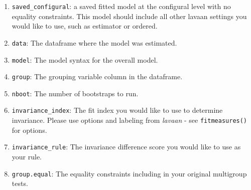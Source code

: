 \documentclass[
  man,floatsintext]{apa7}
\newenvironment{Shaded}{\begin{snugshade}}{\end{snugshade}}
\newcommand{\AttributeTok}[1]{\textcolor[rgb]{0.13,0.29,0.53}{#1}}
\newcommand{\CommentTok}[1]{\textcolor[rgb]{0.56,0.35,0.01}{\textit{#1}}}
\newcommand{\DecValTok}[1]{\textcolor[rgb]{0.00,0.00,0.81}{#1}}
\newcommand{\FunctionTok}[1]{\textcolor[rgb]{0.13,0.29,0.53}{\textbf{#1}}}
\newcommand{\NormalTok}[1]{#1}
\newcommand{\OtherTok}[1]{\textcolor[rgb]{0.56,0.35,0.01}{#1}}
\newcommand{\SpecialCharTok}[1]{\textcolor[rgb]{0.81,0.36,0.00}{\textbf{#1}}}
\newcommand{\StringTok}[1]{\textcolor[rgb]{0.31,0.60,0.02}{#1}}
\providecommand{\tightlist}{%
  \setlength{\itemsep}{0pt}\setlength{\parskip}{0pt}}
\begin{document}
\begin{enumerate}
\def\labelenumi{\arabic{enumi})}
\tightlist
\item
  \texttt{saved\_configural}: a saved fitted model at the configural level with no equality constraints. This model should include all other lavaan settings you would like to use, such as estimator or ordered.
\item
  \texttt{data}: The dataframe where the model was estimated.
\item
  \texttt{model}: The model syntax for the overall model.
\item
  \texttt{group}: The grouping variable column in the dataframe.
\item
  \texttt{nboot}: The number of bootstraps to run.
\item
  \texttt{invariance\_index}: The fit index you would like to use to determine invariance. Please use options and labeling from \emph{lavaan} - see \texttt{fitmeasures()} for options.
\item
  \texttt{invariance\_rule}: The invariance difference score you would like to use as your rule.
\item
  \texttt{group.equal}: The equality constraints including in your original multigroup tests.
\end{enumerate}

\small

\begin{Shaded}
\end{Shaded}
\end{document}
